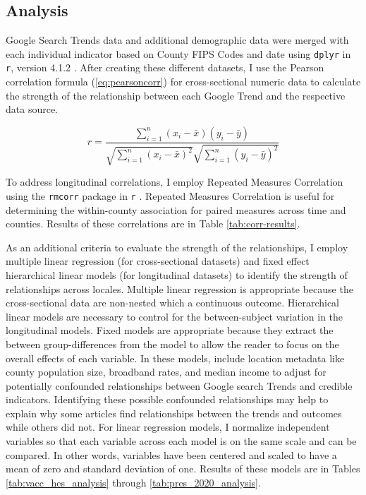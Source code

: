 
\subsection{Analysis}
Google Search Trends data and additional demographic data were merged with each
individual indicator based on County FIPS Codes and date using \texttt{dplyr} in
\texttt{r}, version 4.1.2 \citep{tidyverse}. After creating these different
datasets, I use the Pearson correlation formula (\eqref{eq:pearsoncorr}) for
cross-sectional numeric data to calculate the strength of the relationship
between each Google Trend and the respective data source.

\begin{equation}
 r =
  \frac{ \sum_{i=1}^{n}(x_i-\bar{x})(y_i-\bar{y}) }{
        \sqrt{\sum_{i=1}^{n}(x_i-\bar{x})^2}\sqrt{\sum_{i=1}^{n}(y_i-\bar{y})^2}} \label{eq:pearsoncorr}
\end{equation}

To address longitudinal correlations, I employ Repeated Measures Correlation
using the \texttt{rmcorr} package in \texttt{r} \citep{bland1995, bakdash2017}. 
Repeated Measures Correlation is useful for determining the within-county
association for paired measures across time and counties. Results of these 
correlations are in Table \ref{tab:corr-results}.

As an additional criteria to evaluate the strength of the relationships, I
employ multiple linear regression (for cross-sectional datasets) and fixed
effect hierarchical linear models \citep{pinheiro_etal21} (for longitudinal
datasets) to identify the strength of relationships across locales. Multiple
linear regression is appropriate because the cross-sectional data are non-nested
which a continuous outcome. Hierarchical linear models are necessary to control
for the between-subject variation in the longitudinal models. Fixed models are
appropriate because they extract the between group-differences from the model to
allow the reader to focus on the overall effects of each variable. In these
models, include location metadata like county population size, broadband rates,
and median income to adjust for potentially confounded relationships between
Google search Trends and credible indicators. Identifying these possible
confounded relationships may help to explain why some articles find
relationships between the trends and outcomes while others did not. For linear
regression models, I normalize independent variables so that each variable
across each model is on the same scale and can be compared. In other words,
variables have been centered and scaled to have a mean of zero and standard
deviation of one. Results of these models are in Tables
\ref{tab:vacc_hes_analysis} through \ref{tab:pres_2020_analysis}.

